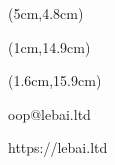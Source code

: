 
\pagestyle{empty}
\BgThispage

\setlength{\parindent}{0pt}

\quad

\begin{textblock*}{3cm}(5cm,4.8cm)
\centering
{\color{white}\sf{}
\ScanForMore
}
\end{textblock*}



\begin{textblock*}{7cm}(1cm,14.9cm)
    \sffamily
    {\bfseries{} \Company}
\end{textblock*}

\begin{textblock*}{6cm}(1.6cm,15.9cm)
    \linespread{1.42}
    \sffamily

    {oop@lebai.ltd}

    {https://lebai.ltd}

    \Address
\end{textblock*}

